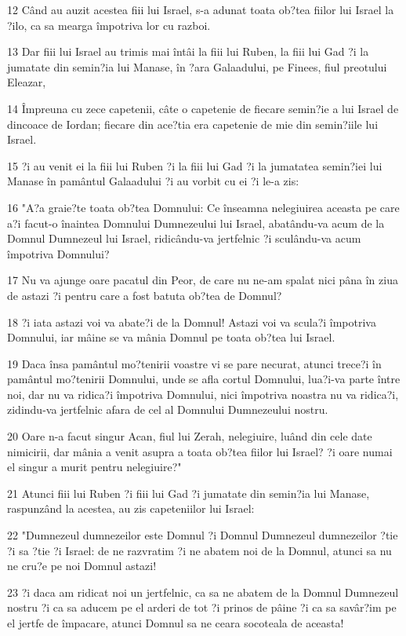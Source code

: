\par 12 Când au auzit acestea fiii lui Israel, s-a adunat toata ob?tea fiilor lui Israel la ?ilo, ca sa mearga împotriva lor cu razboi.
\par 13 Dar fiii lui Israel au trimis mai întâi la fiii lui Ruben, la fiii lui Gad ?i la jumatate din semin?ia lui Manase, în ?ara Galaadului, pe Finees, fiul preotului Eleazar,
\par 14 Împreuna cu zece capetenii, câte o capetenie de fiecare semin?ie a lui Israel de dincoace de Iordan; fiecare din ace?tia era capetenie de mie din semin?iile lui Israel.
\par 15 ?i au venit ei la fiii lui Ruben ?i la fiii lui Gad ?i la jumatatea semin?iei lui Manase în pamântul Galaadului ?i au vorbit cu ei ?i le-a zis:
\par 16 "A?a graie?te toata ob?tea Domnului: Ce înseamna nelegiuirea aceasta pe care a?i facut-o înaintea Domnului Dumnezeului lui Israel, abatându-va acum de la Domnul Dumnezeul lui Israel, ridicându-va jertfelnic ?i sculându-va acum împotriva Domnului?
\par 17 Nu va ajunge oare pacatul din Peor, de care nu ne-am spalat nici pâna în ziua de astazi ?i pentru care a fost batuta ob?tea de Domnul?
\par 18 ?i iata astazi voi va abate?i de la Domnul! Astazi voi va scula?i împotriva Domnului, iar mâine se va mânia Domnul pe toata ob?tea lui Israel.
\par 19 Daca însa pamântul mo?tenirii voastre vi se pare necurat, atunci trece?i în pamântul mo?tenirii Domnului, unde se afla cortul Domnului, lua?i-va parte între noi, dar nu va ridica?i împotriva Domnului, nici împotriva noastra nu va ridica?i, zidindu-va jertfelnic afara de cel al Domnului Dumnezeului nostru.
\par 20 Oare n-a facut singur Acan, fiul lui Zerah, nelegiuire, luând din cele date nimicirii, dar mânia a venit asupra a toata ob?tea fiilor lui Israel? ?i oare numai el singur a murit pentru nelegiuire?"
\par 21 Atunci fiii lui Ruben ?i fiii lui Gad ?i jumatate din semin?ia lui Manase, raspunzând la acestea, au zis capeteniilor lui Israel:
\par 22 "Dumnezeul dumnezeilor este Domnul ?i Domnul Dumnezeul dumnezeilor ?tie ?i sa ?tie ?i Israel: de ne razvratim ?i ne abatem noi de la Domnul, atunci sa nu ne cru?e pe noi Domnul astazi!
\par 23 ?i daca am ridicat noi un jertfelnic, ca sa ne abatem de la Domnul Dumnezeul nostru ?i ca sa aducem pe el arderi de tot ?i prinos de pâine ?i ca sa savâr?im pe el jertfe de împacare, atunci Domnul sa ne ceara socoteala de aceasta!
